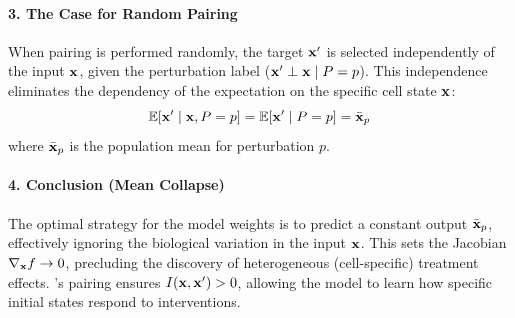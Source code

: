\paragraph{3. The Case for Random Pairing}
When pairing is performed randomly, the target ${\mathbf{x}}'$ is selected independently of the input ${\mathbf{x}}$, given the perturbation label (${\mathbf{x}}' \perp {\mathbf{x}} \mid P=p$). This independence eliminates the dependency of the expectation on the specific cell state ${\mathbf{x}}$:
\begin{equation}
    \mathbb{E}[{\mathbf{x}}' \mid {\mathbf{x}}, P=p] = \mathbb{E}[{\mathbf{x}}' \mid P=p] = \bar{{\mathbf{x}}}_p
\end{equation}
where $\bar{{\mathbf{x}}}_p$ is the population mean for perturbation $p$.

\paragraph{4. Conclusion (Mean Collapse)}
The optimal strategy for the model weights is to predict a constant output $\bar{{\mathbf{x}}}_p$, effectively ignoring the biological variation in the input ${\mathbf{x}}$. This sets the Jacobian $\nabla_{\mathbf{x}} f \to 0$, precluding the discovery of heterogeneous (cell-specific) treatment effects. 's  pairing ensures $I({\mathbf{x}}, {\mathbf{x}}') > 0$, allowing the model to learn how specific initial states respond to interventions.

